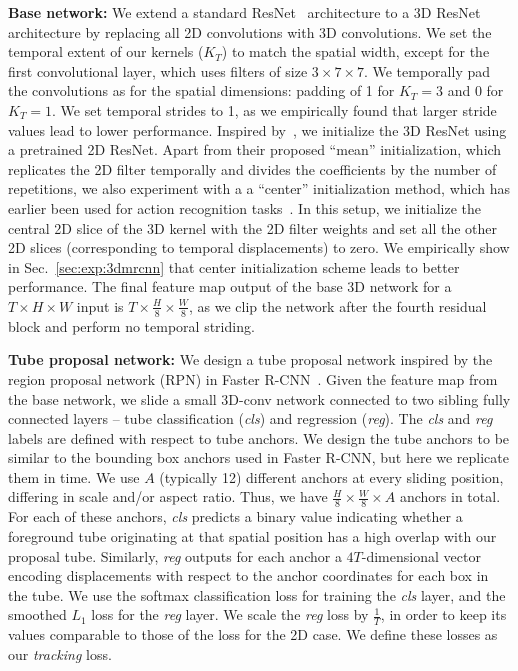 \documentclass[10pt,twocolumn,letterpaper]{article}
\begin{document}
{\noindent \bf Base network:} We extend a standard ResNet~\cite{He15resnet} architecture to a 3D ResNet architecture
by replacing all 2D convolutions with 3D convolutions. We set the temporal extent of our kernels ($K_T$) to match the
spatial width, except for the first convolutional layer, which uses filters of size $3\times 7\times 7$. We temporally pad the
convolutions as for the spatial dimensions: padding of 1 for $K_T=3$ and 0 for $K_T=1$. We set temporal strides
to 1, as we empirically found that larger stride values lead to lower performance. Inspired by~\cite{carreira2017quo,Feichtenhofer16spatiotemporal},
we initialize the 3D ResNet using a pretrained 2D ResNet. Apart from their proposed
``mean'' initialization, which replicates the 2D filter temporally and divides the coefficients by the number of repetitions, we 
also experiment with a
a ``center'' initialization method, which has earlier been used for action recognition tasks~\cite{Feichtenhofer17spatiotemporal}. In this setup, we initialize the central 2D slice of the 3D kernel with the 2D filter weights and set all the other 2D slices (corresponding to temporal displacements) to zero.
We empirically show in Sec.~\ref{sec:exp:3dmrcnn} that center initialization scheme leads to better performance. The final feature map output of the base 3D network for a $T\times H\times W$
input is $T\times \frac{H}{8}\times \frac{W}{8}$, as we clip the network after the fourth residual block and perform no temporal striding.

{\noindent \bf Tube proposal network:}
We design a tube proposal network inspired by the region proposal network (RPN) in Faster R-CNN~\cite{ren2015faster}.
Given the feature map from the base network, we slide a small 3D-conv network connected to two sibling fully
connected layers -- tube classification ({\em cls}) and regression ({\em reg}). The {\em cls} and {\em reg} labels are
defined with respect to tube anchors. We design the tube anchors to be similar to the bounding box anchors used in Faster R-CNN,
but here we replicate them in time. We use $A$ (typically 12) different anchors at every sliding position, differing in scale and/or aspect ratio. Thus, we have $\frac{H}{8}\times \frac{W}{8}\times A$ anchors in total. For each of these anchors, {\em cls} predicts a binary value indicating whether a foreground tube originating at that spatial position has a high overlap with our proposal tube. 
Similarly, {\em reg} outputs for each anchor a $4T$-dimensional vector encoding  displacements with respect to the anchor coordinates for each box in the tube.
We use the softmax classification loss for training the {\em cls} layer, and the smoothed $L_1$ loss for the  {\em reg} layer. We scale the {\em reg} loss by $\frac{1}{T}$, in order to keep its values comparable to those of the loss for the 2D case. We define these losses as our {\em tracking} loss.
\end{document}
